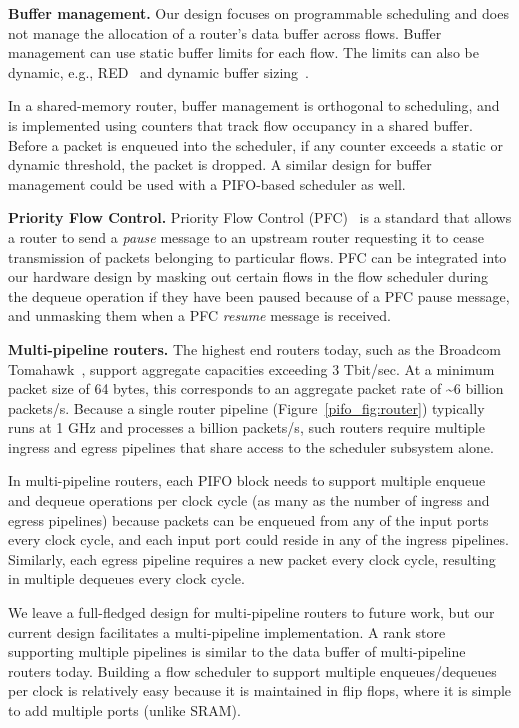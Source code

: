 \medskip
\noindent
\textbf{Buffer management.}
Our design focuses on programmable scheduling and does not manage the allocation
of a router's data buffer across flows.  Buffer management can use
static buffer limits for each flow. The limits can also be dynamic, e.g.,
RED~\cite{red} and dynamic buffer sizing~\cite{broadcom_dynamic}.

In a shared-memory router, buffer management is orthogonal to scheduling,
and is implemented using counters that track flow occupancy in a shared
buffer. Before a packet is enqueued into the scheduler, if any counter
 exceeds a static or dynamic threshold, the packet is dropped. A similar
design for buffer management could be used with a PIFO-based scheduler as well.

\medskip
\noindent
\textbf{Priority Flow Control.}
Priority Flow Control (PFC)~\cite{pfc} is a standard that allows a router to
send a {\em pause} message to an upstream router requesting it to cease
transmission of packets belonging to particular flows. PFC can be integrated
into our hardware design by masking out certain flows in the flow scheduler
during the dequeue operation if they have been paused because of a PFC pause
message, and unmasking them when a PFC {\em resume} message is received.

\medskip
\noindent
\textbf{Multi-pipeline routers.}
The highest end routers today, such as the Broadcom Tomahawk~\cite{tomahawk},
support aggregate capacities exceeding 3 Tbit/sec. At a minimum packet size of
64 bytes, this corresponds to an aggregate packet rate of \textasciitilde6
billion packets/s. Because a single router pipeline
(Figure~\ref{pifo_fig:router}) typically runs at 1 GHz and processes a
billion packets/s, such routers require multiple ingress and egress pipelines
that share access to the scheduler subsystem alone.

In multi-pipeline routers, each PIFO block needs to support multiple enqueue
and dequeue operations per clock cycle (as many as the number of ingress and
egress pipelines) because packets can be enqueued from any of the input ports
every clock cycle, and each input port could reside in any of the ingress
pipelines. Similarly, each egress pipeline requires a new packet every clock
cycle, resulting in multiple dequeues every clock cycle.

We leave a full-fledged design for multi-pipeline routers to future work, but our
current design facilitates a multi-pipeline implementation. A rank store
supporting multiple pipelines is similar to the data buffer of multi-pipeline
routers today. Building a flow scheduler to support multiple enqueues/dequeues
per clock is relatively easy because it is maintained in flip flops, where it
is simple to add multiple ports (unlike SRAM).
